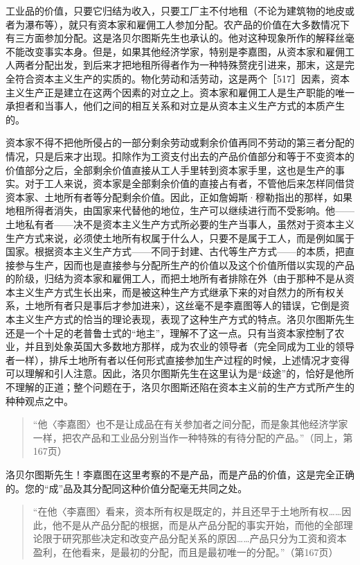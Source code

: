 工业品的价值，只要它归结为收入，只要工厂主不付地租（不论为建筑物的地皮或者为瀑布等），就只有资本家和雇佣工人参加分配。农产品的价值在大多数情况下有三方面参加分配。这是洛贝尔图斯先生也承认的。他对这种现象所作的解释丝毫不能改变事实本身。但是，如果其他经济学家，特别是李嘉图，从资本家和雇佣工人两者分配出发，到后来才把地租所得者作为一种特殊赘疣引进来，那末，这是完全符合资本主义生产的实质的。物化劳动和活劳动，这是两个［517］因素，资本主义生产正是建立在这两个因素的对立之上。资本家和雇佣工人是生产职能的唯一承担者和当事人，他们之间的相互关系和对立是从资本主义生产方式的本质产生的。

资本家不得不把他所侵占的一部分剩余劳动或剩余价值再同不劳动的第三者分配的情况，只是后来才出现。扣除作为工资支付出去的产品价值部分和等于不变资本的价值部分之后，全部剩余价值直接从工人手里转到资本家手里，这也是生产的事实。对于工人来说，资本家是全部剩余价值的直接占有者，不管他后来怎样同借贷资本家、土地所有者等分配剩余价值。因此，正如詹姆斯·穆勒指出的那样，如果地租所得者消失，由国家来代替他的地位，生产可以继续进行而不受影响。他——土地私有者——决不是资本主义生产方式所必要的生产当事人，虽然对于资本主义生产方式来说，必须使土地所有权属于什么人，只要不是属于工人，而是例如属于国家。根据资本主义生产方式——不同于封建、古代等生产方式——的本质，把直接参与生产，因而也是直接参与分配所生产的价值以及这个价值所借以实现的产品的阶级，归结为资本家和雇佣工人，而把土地所有者排除在外（由于那种不是从资本主义生产方式生长出来，而是被这种生产方式继承下来的对自然力的所有权关系，土地所有者只是事后才参加进来），这丝毫不是李嘉图等人的错误，它倒是资本主义生产方式的恰当的理论表现，表现了这种生产方式的特点。洛贝尔图斯先生还是一个十足的老普鲁士式的“地主”，理解不了这一点。只有当资本家控制了农业，并且到处象英国大多数地方那样，成为农业的领导者（完全同成为工业的领导者一样），排斥土地所有者以任何形式直接参加生产过程的时候，上述情况才变得可以理解和引人注意。因此，洛贝尔图斯先生在这里认为是“歧途”的，恰好是他所不理解的正道；整个问题在于，洛贝尔图斯还陷在资本主义前的生产方式所产生的种种观点之中。

\begin{quote}{“他〈李嘉图〉也不是让成品在有关参加者之间分配，而是象其他经济学家一样，把农产品和工业品分别当作一种特殊的有待分配的产品。”（同上，第167页）}\end{quote}

洛贝尔图斯先生！李嘉图在这里考察的不是产品，而是产品的价值，这是完全正确的。您的“成”品及其分配同这种价值分配毫无共同之处。

\begin{quote}{“在他〈李嘉图〉看来，资本所有权是既定的，并且还早于土地所有权……因此，他不是从产品分配的根据，而是从产品分配的事实开始，而他的全部理论限于研究那些决定和改变产品分配关系的原因……产品只分为工资和资本盈利，在他看来，是最初的分配，而且是最初唯一的分配。”（第167页）}\end{quote}

